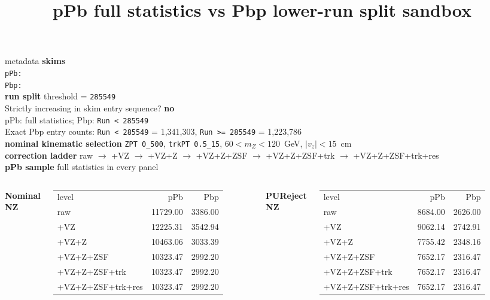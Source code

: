 \documentclass[aspectratio=169]{beamer}
\title{pPb full statistics vs Pbp lower-run split sandbox}
\date{}
\begin{document}
\begin{frame}
  \titlepage
\end{frame}

\begin{frame}[t]{metadata}
  \tiny
  \textbf{skims}\\
  \texttt{pPb: }\\
  \texttt{Pbp: }\\
  \vspace{0.35em}
  \textbf{run split} threshold = \texttt{285549}\\
  Strictly increasing in skim entry sequence? \textbf{no}\\
  pPb: full statistics; Pbp: \texttt{Run < 285549}\\
  Exact Pbp entry counts: \texttt{Run < 285549} = 1,341,303, \texttt{Run >= 285549} = 1,223,786\\
  \vspace{0.35em}
  \textbf{nominal kinematic selection} \texttt{ZPT 0\_500}, \texttt{trkPT 0.5\_15}, $60 < m_Z < 120$~GeV, $|v_z| < 15$~cm\\
  \textbf{correction ladder} raw $\to$ +VZ $\to$ +VZ+Z $\to$ +VZ+Z+ZSF $\to$ +VZ+Z+ZSF+trk $\to$ +VZ+Z+ZSF+trk+res\\
  \textbf{pPb sample} full statistics in every panel\\
  \vspace{0.4em}
  \begin{columns}[t,onlytextwidth]
    \centering
    \textbf{Nominal NZ}\\[-0.2em]
    \scriptsize
    \begin{tabular}{lrr}
      level & pPb & Pbp \\
raw & 11729.00 & 3386.00 \\
+VZ & 12225.31 & 3542.94 \\
+VZ+Z & 10463.06 & 3033.39 \\
+VZ+Z+ZSF & 10323.47 & 2992.20 \\
+VZ+Z+ZSF+trk & 10323.47 & 2992.20 \\
+VZ+Z+ZSF+trk+res & 10323.47 & 2992.20 \\
    \end{tabular}
    \centering
    \textbf{PUReject NZ}\\[-0.2em]
    \scriptsize
    \begin{tabular}{lrr}
      level & pPb & Pbp \\
raw & 8684.00 & 2626.00 \\
+VZ & 9062.14 & 2742.91 \\
+VZ+Z & 7755.42 & 2348.16 \\
+VZ+Z+ZSF & 7652.17 & 2316.47 \\
+VZ+Z+ZSF+trk & 7652.17 & 2316.47 \\
+VZ+Z+ZSF+trk+res & 7652.17 & 2316.47 \\
    \end{tabular}
  \end{columns}
\end{frame}
\end{document}
